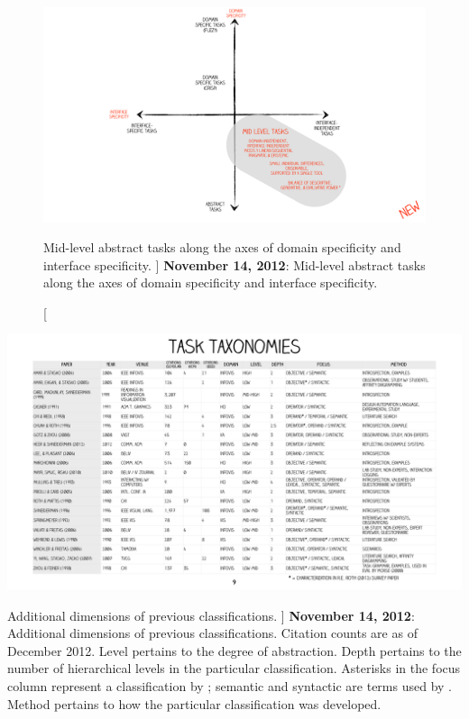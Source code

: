 

\begin{figure}
	\centering
	\includegraphics[width=\textwidth]{figures/typology-domain-vs-interface.pdf}
	\caption
	[
	    Mid-level abstract tasks along the axes of domain specificity and interface specificity.
	]
	{
	    {\bf November 14, 2012}: Mid-level abstract tasks along the axes of domain specificity and interface specificity.
	}
	\centering
	\label{app:typology:fig:domain-vs-interface}
\end{figure}



\begin{table}
	\centering
	\includegraphics[width=\textwidth]{figures/typology-survey.pdf}
	\caption
	[
	    Additional dimensions of previous classifications.
	]
	{
	    {\bf November 14, 2012}: Additional dimensions of previous classifications. Citation counts are as of December 2012. Level pertains to the degree of abstraction. Depth pertains to the number of hierarchical levels in the particular classification. Asterisks in the focus column represent a classification by \citet{Roth2012a}; semantic and syntactic are terms used by \citet{Chuah1996}. Method pertains to how the particular classification was developed.
	}
	\centering
	\label{app:typology:table:survey}
\end{table}

